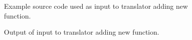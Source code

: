 \begin{figure}[!h]
{\indent
{\mySmallFontSize

\label{Tutorial:exampleInputCode_ExampleCodeCoverage}

\begin{latexonly}
   
\end{latexonly}

\begin{htmlonly}
   
\end{htmlonly}

}
}
\caption{Example source code used as input to translator adding new function.}
\end{figure}

\begin{figure}[!h]
{\indent
{\mySmallFontSize

\label{Tutorial:exampleOutput_ExampleCodeCoverage}

\begin{latexonly}
   
\end{latexonly}

\begin{htmlonly}
   
\end{htmlonly}

}
}
\caption{Output of input to translator adding new function.}
\end{figure}


